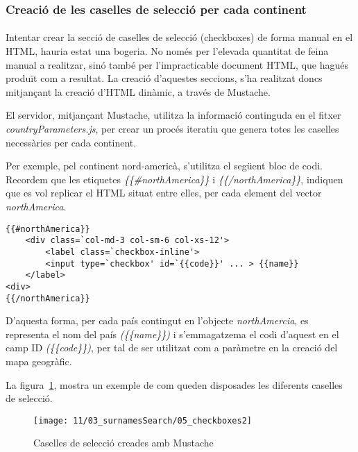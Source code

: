 \subsubsection{Creació de les caselles de selecció per cada continent}

\paragraph{}
Intentar crear la secció de caselles de selecció (checkboxes) de forma manual en el HTML, hauria estat una bogeria. No només per l'elevada quantitat de feina manual a realitzar, sinó també per l'impracticable document HTML, que hagués produït com a resultat. La creació d'aquestes seccions, s'ha realitzat doncs mitjançant la creació d'HTML dinàmic, a través de Mustache.

El servidor, mitjançant Mustache, utilitza la informació continguda en el fitxer \emph{countryParameters.js}, per crear un procés iteratiu que genera totes les caselles ne\-ce\-ssà\-ries per cada continent.

Per exemple, pel continent nord-americà, s'utilitza el següent bloc de codi. Recordem que les etiquetes \emph{\{\{\#northAmerica\}\}} i \emph{\{\{/northAmerica\}\}}, indiquen que es vol replicar el HTML situat entre elles, per cada element del vector \emph{northAmerica}.

\begin{lstlisting}[style=rawOwn,caption={Caselles de selecció creades mitjançant Mustache}]
{{#northAmerica}}
    <div class=`col-md-3 col-sm-6 col-xs-12'>
        <label class=`checkbox-inline'>
        <input type=`checkbox' id=`{{code}}' ... > {{name}}
    </label>
<div>
{{/northAmerica}}
\end{lstlisting}

D'aquesta forma, per cada país contingut en l’objecte \emph{northAmercia}, es representa el nom del país \emph{(\{\{name\}\})}  i s'emmagatzema el codi d'aquest en el camp ID \emph{(\{\{code\}\})}, per tal de ser utilitzat com a paràmetre en la creació del mapa geogràfic.

La figura~\ref{fig:checkboxes}, mostra un exemple de com queden disposades les diferents caselles de selecció.

\begin{figure}[h]
    \texttt{[image: 11/03\_surnamesSearch/05\_checkboxes2]}
    \centering
    \caption{Caselles de selecció creades amb Mustache}\label{fig:checkboxes}
\end{figure}
